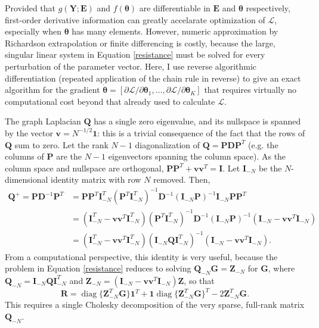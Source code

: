 \documentclass[11pt]{article}
\DeclareMathOperator*{\diag}{diag}
\newcommand{\mat}[1]{\mathbf{#1}}
\begin{document}
Provided that $g(\mat Y; \mat E)$ and $f(\bm \theta)$ are differentiable in
$\mat E$ and $\bm \theta$ respectively, first-order derivative information can
greatly accelarate optimization of $\mathcal{L}$, especially when $\bm \theta$
has many elements. 
However, numeric approximation by Richardson extrapolation or finite differencing
is costly, because the large, singular linear system in Equation \ref{resistance} must be
solved for every perturbation of the parameter vector.
Here, I use reverse algorithmic differentiation (repeated application of the chain
rule in reverse) to give an exact algorithm for the gradient
$\dot{\bm \theta} = [\partial \mathcal{L}/\partial \bm \theta_1, \dots, \partial \mathcal{L}/\partial \bm \theta_K]$ 
that requires virtually no computational cost beyond that already used to calculate
$\mathcal{L}$.

The graph Laplacian $\mat Q$ has a single zero eigenvalue, and its nullspace is
spanned by the vector $\mat v = N^{-1/2} \mat 1$: this is a trivial consequence of the
fact that the rows of $\mat Q$ sum to zero. Let the rank $N-1$
diagonalization of $\mat Q = \mat P \mat D \mat P^T$ (e.g. the columns of $\mat
P$ are the $N-1$ eigenvectors spanning the column space). As the column space
and nullspace are orthogonal, $\mat P \mat P^T + \mat v \mat v^T = \mat I$. 
Let $\mat I_{-N}$ be the $N$-dimensional identity matrix with row $N$ removed. Then, 
\[ 
  \begin{aligned} 
    \mat Q^+ = \mat P \mat D^{-1} \mat P^T 
           & = \mat P \mat P^T \mat I_{-N}^T (\mat P^T \mat I_{-N}^T)^{-1} \mat D^{-1} (\mat I_{-N} \mat P)^{-1} \mat I_{-N} \mat P \mat P^T \\ 
           & = (\mat I_{-N}^T - \mat v \mat v^T \mat I_{-N}^T) (\mat P^T \mat I_{-N}^T)^{-1} \mat D^{-1} (\mat I_{-N} \mat P)^{-1} (\mat I_{-N} - \mat v \mat v^T \mat I_{-N}) \\ 
           & = (\mat I_{-N}^T - \mat v \mat v^T \mat I_{-N}^T) (\mat I_{-N} \mat Q \mat I_{-N}^T)^{-1} (\mat I_{-N} - \mat v \mat v^T \mat I_{-N}).
  \end{aligned} 
\] 
From a computational perspective, this identity is very useful, because the
problem in Equation \ref{resistance} reduces to solving 
$\mat Q_{-N} \mat G = \mat Z_{-N}$ for $\mat G$, where 
$\mat Q_{-N} = \mat I_{-N} \mat Q \mat I_{-N}^T$ and 
$\mat Z_{-N} = (\mat I_{-N} - \mat v \mat v^T \mat I_{-N}) \mat Z$, 
so that
\[
  \mat R = \diag \{ \mat Z_{-N}^T \mat G \} \mat 1^T + \mat 1 \diag \{\mat Z_{-N}^T \mat G \}^T - 2 \mat Z_{-N}^T \mat G.
\]
This requires a single Cholesky decomposition of the very sparse, full-rank
matrix $\mat Q_{-N}$.
\end{document}
